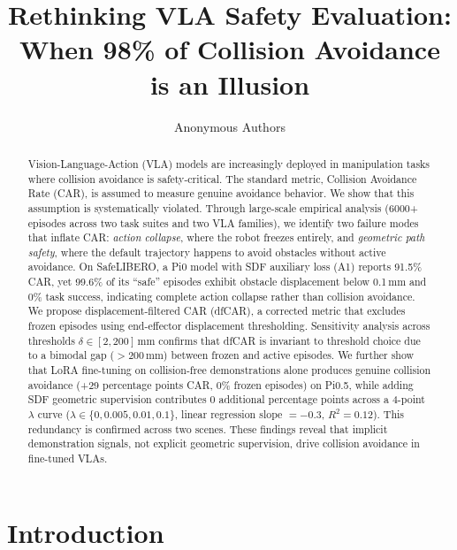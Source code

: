 \documentclass[10pt,letterpaper]{article}
\title{Rethinking VLA Safety Evaluation:\\When 98\% of Collision Avoidance is an Illusion}
\author[1]{Anonymous Authors}
\affil[1]{Anonymous Institution}
\date{}
\begin{document}
\maketitle

\begin{abstract}
Vision-Language-Action (VLA) models are increasingly deployed in manipulation tasks where collision avoidance is safety-critical. The standard metric, Collision Avoidance Rate (CAR), is assumed to measure genuine avoidance behavior. We show that this assumption is systematically violated. Through large-scale empirical analysis (6000+ episodes across two task suites and two VLA families), we identify two failure modes that inflate CAR: \emph{action collapse}, where the robot freezes entirely, and \emph{geometric path safety}, where the default trajectory happens to avoid obstacles without active avoidance. On SafeLIBERO, a Pi0 model with SDF auxiliary loss (A1) reports 91.5\% CAR, yet 99.6\% of its ``safe'' episodes exhibit obstacle displacement below 0.1\,mm and 0\% task success, indicating complete action collapse rather than collision avoidance. We propose displacement-filtered CAR (dfCAR), a corrected metric that excludes frozen episodes using end-effector displacement thresholding. Sensitivity analysis across thresholds $\delta \in [2, 200]$\,mm confirms that dfCAR is invariant to threshold choice due to a bimodal gap ($>$200\,mm) between frozen and active episodes. We further show that LoRA fine-tuning on collision-free demonstrations alone produces genuine collision avoidance (+29 percentage points CAR, 0\% frozen episodes) on Pi0.5, while adding SDF geometric supervision contributes 0 additional percentage points across a 4-point $\lambda$ curve ($\lambda \in \{0, 0.005, 0.01, 0.1\}$, linear regression slope $= -0.3$, $R^2 = 0.12$). This redundancy is confirmed across two scenes. These findings reveal that implicit demonstration signals, not explicit geometric supervision, drive collision avoidance in fine-tuned VLAs.
\end{abstract}

\section{Introduction}
\label{sec:intro}
\end{document}
